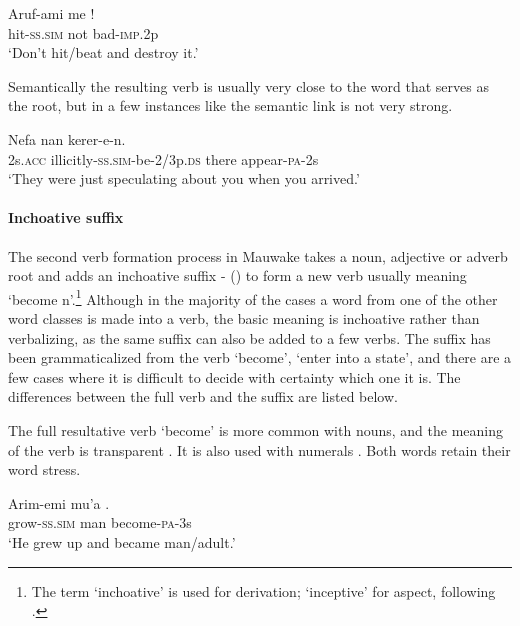 \ea%
\label{ex:3:x189}
\gll Aruf-ami me !\\
hit-\textsc{ss}.\textsc{sim} not bad-\textsc{imp}.2p \\
\glt`Don't hit/beat and destroy it.' 
\z

Semantically the resulting verb is usually very close to the word that serves as the root, but in a few instances like  the semantic link is not very strong.

\ea%
\label{ex:3:x190}
\gll Nefa  nan kerer-e-n. \\
2s.\textsc{acc} illicitly-\textsc{ss}.\textsc{sim}-be-2/3p.\textsc{ds} there appear-\textsc{pa}-2s \\
\glt`They were just speculating about you when you arrived.' 
\z

\paragraph{Inchoative suffix} \label{sec:3.8.2.2.2}
{}
The second verb formation process in Mauwake takes a noun, adjective or adverb root and adds an inchoative suffix - () to form a new verb usually meaning `become n'.\footnote{The term `inchoative' is used for derivation; `inceptive' for aspect, following \citet[95]{Payne1997}.} Although in the majority of the cases a word from one of the other word classes is made into a verb, the basic meaning is inchoative rather than verbalizing, as the same suffix can also be added to a few verbs. The suffix has been grammaticalized from the verb \textstyleEmphasizedVernacularWords{-} `become', `enter into a state', and there are a few cases where it is difficult to decide with certainty which one it is. The differences between the full verb and the suffix are listed below. 

The full resultative verb \textstyleEmphasizedVernacularWords{-} `become' is more common with nouns, and the meaning of the verb is transparent . It is also used with numerals . Both words retain their word stress.

\ea%
\label{ex:3:x191}
\gll Arim-emi mu'a . \\
grow-\textsc{ss}.\textsc{sim} man become-\textsc{pa}-3s \\
\glt`He grew up and became man/adult.'
\z

